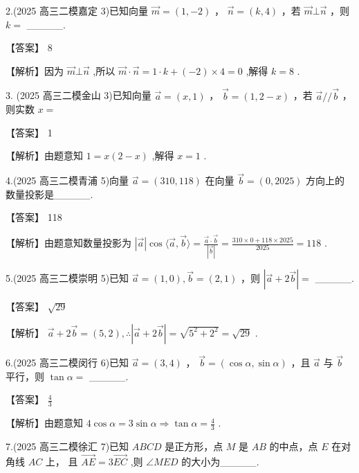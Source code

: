 \documentclass[10pt]{article}
\begin{document}
2.(2025 高三二模嘉定 3)已知向量 \(\overrightarrow{m} = \left( {1, - 2}\right)\) ， \(\overrightarrow{n} = \left( {k,4}\right)\) ，若 \(\overrightarrow{m} \bot  \overrightarrow{n}\) ，则 \(k =\) \_\_\_\_\_.

【答案】 8

【解析】因为 \(\overrightarrow{m} \bot  \overrightarrow{n}\) ,所以 \(\overrightarrow{m} \cdot  \overrightarrow{n} = 1 \cdot  k + \left( {-2}\right)  \times  4 = 0\) ,解得 \(k = 8\) .

3. (2025 高三二模金山 3)已知向量 \(\overrightarrow{a} = \left( {x,1}\right)\) ， \(\overrightarrow{b} = \left( {1,2 - x}\right)\) ，若 \(\overrightarrow{a}//\overrightarrow{b}\) ，则实数 \(x =\)

【答案】 1

【解析】由题意知 \(1 = x\left( {2 - x}\right)\) ,解得 \(x = 1\) .

4.(2025 高三二模青浦 5)向量 \(\overrightarrow{a} = \left( {{310},{118}}\right)\) 在向量 \(\overrightarrow{b} = \left( {0,{2025}}\right)\) 方向上的数量投影是\_\_\_\_\_.

【答案】 118

【解析】由题意知数量投影为 \(\left| \overrightarrow{a}\right| \cos \langle \overrightarrow{a},\overrightarrow{b}\rangle  = \frac{\overrightarrow{a} \cdot  \overrightarrow{b}}{\left| \overrightarrow{b}\right| } = \frac{{310} \times  0 + {118} \times  {2025}}{2025} = {118}\) .

5.(2025 高三二模崇明 5)已知 \(\overrightarrow{a} = \left( {1,0}\right) ,\overrightarrow{b} = \left( {2,1}\right)\) ，则 \(\left| {\overrightarrow{a} + 2\overrightarrow{b}}\right|  =\) \_\_\_\_\_.

【答案】 \(\sqrt{29}\)

【解析】 \(\overrightarrow{a} + 2\overrightarrow{b} = \left( {5,2}\right) ,\therefore \left| {\overrightarrow{a} + 2\overrightarrow{b}}\right|  = \sqrt{{5}^{2} + {2}^{2}} = \sqrt{29}\) .

6.(2025 高三二模闵行 6)已知 \(\overrightarrow{a} = \left( {3,4}\right)\) ， \(\overrightarrow{b} = \left( {\cos \alpha ,\sin \alpha }\right)\) ，且 \(\overrightarrow{a}\) 与 \(\overrightarrow{b}\) 平行，则 \(\tan \alpha  =\) \_\_\_\_\_.

【答案】 \(\frac{4}{3}\)

【解析】由题意知 \(4\cos \alpha  = 3\sin \alpha  \Rightarrow  \tan \alpha  = \frac{4}{3}\) .

7.(2025 高三二模徐汇 7)已知 \({ABCD}\) 是正方形，点 \(M\) 是 \({AB}\) 的中点，点 \(E\) 在对角线 \({AC}\) 上， 且 \(\overrightarrow{AE} = 3\overrightarrow{EC}\) ,则 \(\angle {MED}\) 的大小为\_\_\_\_\_.
\end{document}
